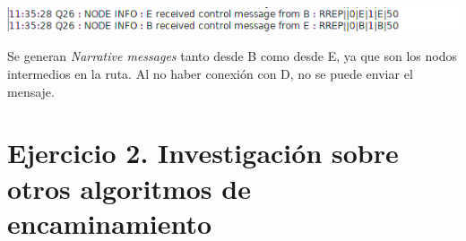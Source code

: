 \documentclass{article}
\begin{document}
\begin{center}
\includegraphics[scale=0.5]{log6.png}
\end{center}

Se generan \textit{Narrative messages} tanto desde B como desde E, ya que son los nodos intermedios en la ruta. Al no haber conexión con D, no se puede enviar el mensaje.
                                                                                                                                                                                                                                                                                                                                                                                                                                                                                                                                                                                                                                                     \section{Ejercicio 2. Investigación sobre otros algoritmos de encaminamiento}
                                                                                                                                                                                                                                                                                                                                                                                                                                                                                                                                                                                                                                                     
\end{document}
